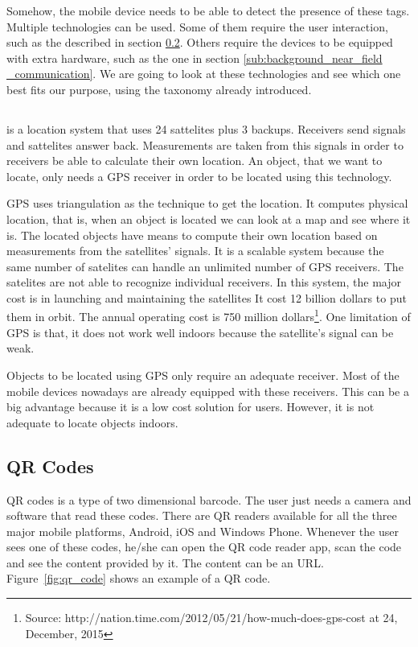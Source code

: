 Somehow, the mobile device needs to be able to detect the presence of these tags.
Multiple technologies can be used.
Some of them require the user interaction, such as the described in section \ref{sub:background_qr_codes}.
Others require the devices to be equipped with extra hardware, such as the one in section \ref{sub:background_near_field _communication}.
We are going to look at these technologies and see which one best fits our purpose, using the taxonomy already introduced.

\subsection{}
\label{sub:background_gps}
\cite{gps} is a location system that uses 24 sattelites plus 3 backups.
Receivers send signals and sattelites answer back. Measurements are taken from this signals in order to receivers be able to calculate their own location.
An object, that we want to locate, only needs a \gls{GPS} receiver in order to be located using this technology.

\gls{GPS} uses triangulation as the technique to get the location.
It computes physical location, that is, when an object is located we can look at a map and see where it is.
The located objects have means to compute their own location based on measurements from the satellites' signals.
It is a scalable system because the same number of satelites can handle an unlimited number of \gls{GPS} receivers.
The satelites are not able to recognize individual receivers.
In this system, the major cost is in launching and maintaining the satellites
It cost 12 billion dollars to put them in orbit. The annual operating cost is 750 million dollars\footnote{Source: http://nation.time.com/2012/05/21/how-much-does-gps-cost at 24, December, 2015}.
One limitation of \gls{GPS} is that, it does not work well indoors because the satellite's signal can be weak.

Objects to be located using \gls{GPS} only require an adequate receiver. Most of the mobile devices nowadays are already equipped with these receivers.
This can be a big advantage because it is a low cost solution for users.
However, it is not adequate to locate objects indoors.

\subsection{QR Codes}
\label{sub:background_qr_codes}
\gls{QR} codes is a type of two dimensional barcode.
The user just needs a camera and software that read these codes.
There are \gls{QR} readers available for all the three major mobile platforms, Android, iOS and Windows Phone.
Whenever the user sees one of these codes, he/she can open the \gls{QR} code reader app, scan the code and see the content provided by it.
The content can be an \gls{URL}.
Figure~\ref{fig:qr_code} shows an example of a \gls{QR} code.

